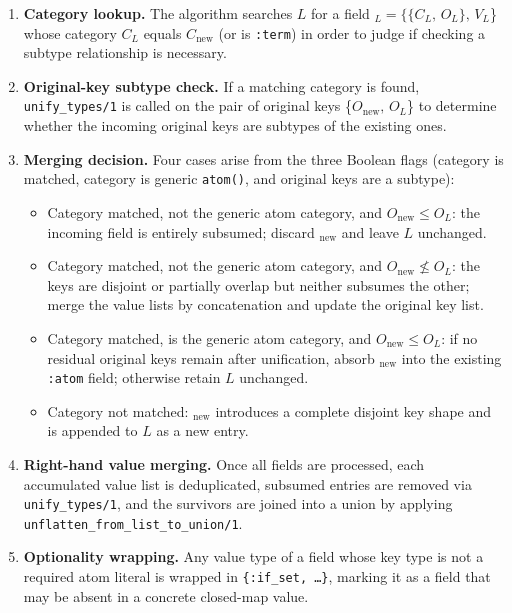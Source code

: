\begin{enumerate}
    \item \textbf{Category lookup.}
          The algorithm searches $L$ for a field \ETF$_L = \{\{C_L,\, O_L\},\, V_L$\} whose category $C_L$ equals $C_\text{new}$ (or is \texttt{:term}) in order to judge if checking a subtype relationship is necessary.
    \item \textbf{Original-key subtype check.}
          If a matching category is found, \texttt{unify\_types/1} is called on the pair of original keys \{$O_\text{new},\, O_L$\} to determine whether the incoming original keys are subtypes of the existing ones.
    \item \textbf{Merging decision.}
          Four cases arise from the three Boolean flags (category is matched, category is generic \texttt{atom()}, and original keys are a subtype):
          \begin{itemize}
              \item Category matched, not the generic atom category, and $O_\text{new} \leq O_L$: the incoming field is entirely subsumed; discard \ETF$_\text{new}$ and leave $L$ unchanged.
              \item Category matched, not the generic atom category, and $O_\text{new} \not\leq O_L$: the keys are disjoint or partially overlap but neither subsumes the other; merge the value lists by concatenation and update the original key list.
              \item Category matched, is the generic atom category, and $O_\text{new} \leq O_L$: if no residual original keys remain after unification, absorb \ETF$_\text{new}$ into the existing \texttt{:atom} field; otherwise retain $L$ unchanged.
              \item Category not matched: \ETF$_\text{new}$ introduces a complete disjoint key shape and is appended to $L$ as a new entry.
          \end{itemize}
    \item \textbf{Right-hand value merging.}
          Once all fields are processed, each accumulated value list is deduplicated, subsumed entries are removed via \texttt{unify\_types/1}, and the survivors are joined into a union by applying \texttt{unflatten\_from\_list\_to\_union/1}.
    \item \textbf{Optionality wrapping.}
          Any value type of a field whose key type is not a required atom literal is wrapped in \texttt{\{:if\_set, \ldots\}}, marking it as a field that may be absent in a concrete closed-map value.
\end{enumerate}

